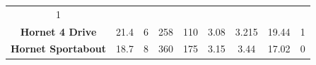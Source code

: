 \documentclass[12pt,oneside]{reedthesis}
\theoremstyle{definition}
\theoremstyle{definition}
\theoremstyle{definition}
\theoremstyle{remark}
\begin{document}
\begin{longtable}[]{@{}ccccccccc@{}}
\begin{minipage}[t]{0.04\columnwidth}
1\strut
\end{minipage}\tabularnewline
\begin{minipage}[t]{0.24\columnwidth}\centering\strut
\textbf{Hornet 4 Drive}\strut
\end{minipage} & \begin{minipage}[t]{0.07\columnwidth}\centering\strut
21.4\strut
\end{minipage} & \begin{minipage}[t]{0.06\columnwidth}\centering\strut
6\strut
\end{minipage} & \begin{minipage}[t]{0.07\columnwidth}\centering\strut
258\strut
\end{minipage} & \begin{minipage}[t]{0.06\columnwidth}\centering\strut
110\strut
\end{minipage} & \begin{minipage}[t]{0.07\columnwidth}\centering\strut
3.08\strut
\end{minipage} & \begin{minipage}[t]{0.08\columnwidth}\centering\strut
3.215\strut
\end{minipage} & \begin{minipage}[t]{0.08\columnwidth}\centering\strut
19.44\strut
\end{minipage} & \begin{minipage}[t]{0.04\columnwidth}\centering\strut
1\strut
\end{minipage}\tabularnewline
\begin{minipage}[t]{0.24\columnwidth}\centering\strut
\textbf{Hornet Sportabout}\strut
\end{minipage} & \begin{minipage}[t]{0.07\columnwidth}\centering\strut
18.7\strut
\end{minipage} & \begin{minipage}[t]{0.06\columnwidth}\centering\strut
8\strut
\end{minipage} & \begin{minipage}[t]{0.07\columnwidth}\centering\strut
360\strut
\end{minipage} & \begin{minipage}[t]{0.06\columnwidth}\centering\strut
175\strut
\end{minipage} & \begin{minipage}[t]{0.07\columnwidth}\centering\strut
3.15\strut
\end{minipage} & \begin{minipage}[t]{0.08\columnwidth}\centering\strut
3.44\strut
\end{minipage} & \begin{minipage}[t]{0.08\columnwidth}\centering\strut
17.02\strut
\end{minipage} & \begin{minipage}[t]{0.04\columnwidth}\centering\strut
0\strut
\end{minipage}\tabularnewline
\bottomrule
\end{longtable}
\end{document}
